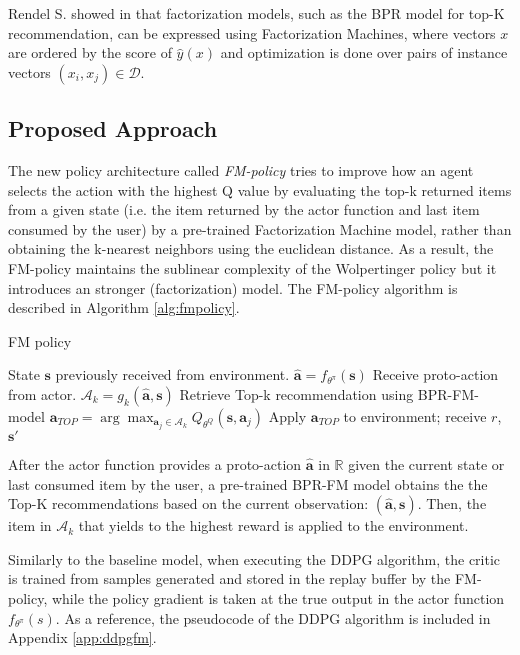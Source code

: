 Rendel S. showed in \cite{rendle2012factorization} that factorization models, such as the BPR model for top-K recommendation, can be expressed using Factorization Machines, where vectors $x$ are ordered by the score of $\hat{y}(x)$ and optimization is done over pairs of instance vectors $(x_i, x_j) \in \mathcal{D}$.

\subsection{Proposed Approach}

The new policy architecture called \textit{FM-policy} tries to improve how an agent selects the action with the highest Q value by evaluating the top-k returned items from a given state (i.e. the item returned by the actor function and last item consumed by the user) by a pre-trained Factorization Machine model, rather than obtaining the k-nearest neighbors using the euclidean distance. As a result, the FM-policy maintains the sublinear complexity of the Wolpertinger policy but it introduces an stronger (factorization) model. The FM-policy algorithm is described in Algorithm \ref{alg:fmpolicy}.

\begin{center}
 \begin{algorithm}[t]
    \SetAlgoLined\DontPrintSemicolon
    \caption{FM policy}
    \label{alg:fmpolicy}
    
    State $\mathbf{s}$ previously received from environment.\;
    $\hat{\mathbf{a}} = f_{\theta^{\pi}}(\mathbf{s})$ {Receive proto-action from actor}.\;
    $\mathcal{A}_k = g_k(\hat{\mathbf{a}}, \mathbf{s})$ {Retrieve Top-k recommendation using BPR-FM-model}\;
    $\mathbf{a}_{TOP} = \arg \max_{\mathbf{a}_j \in \mathcal{A}_k} Q_{\theta^{Q}}(\mathbf{s}, \mathbf{a}_j)$\;
    Apply $\mathbf{a}_{TOP}$ to environment; receive $r$, $\mathbf{s}'$\;
  \end{algorithm}
\end{center}
After the actor function provides a proto-action $\hat{\mathbf{a}}$ in $\mathbb{R}$ given the current state or last consumed item by the user, a pre-trained BPR-FM model obtains the the Top-K recommendations based on the current observation: $(\hat{\mathbf{a}}, \mathbf{s})$. Then, the item in $\mathcal{A}_k$ that yields to the highest reward is applied to the environment.

Similarly to the baseline model, when executing the DDPG algorithm, the critic is trained from samples generated and stored in the replay buffer by the FM-policy, while the policy gradient is taken at the true output in the actor function $f_{\theta^{\pi}}(s)$. As a reference, the pseudocode of the DDPG algorithm is included in Appendix \ref{app:ddpgfm}.
